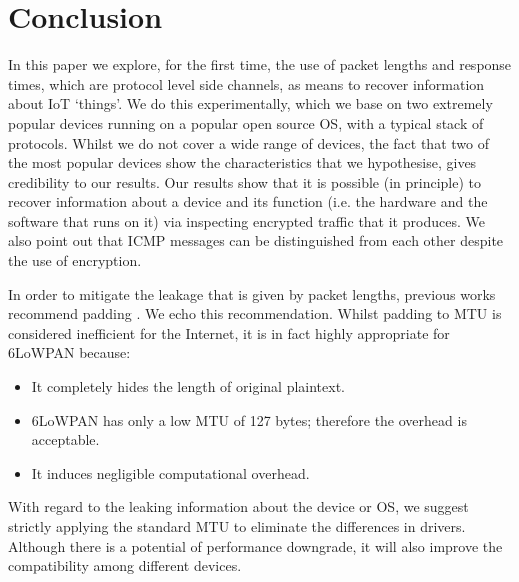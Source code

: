 \section{Conclusion\label{sec: Conclusion}}

In this paper we explore, for the first time, the use of packet lengths and response times, which are protocol level side channels, as means to recover information about IoT `things'. We do this experimentally, which we base on two extremely popular devices running on a popular open source OS, with a typical stack of protocols. Whilst we do not cover a wide range of devices, the fact that two of the most popular devices show the characteristics that we hypothesise, gives credibility to our results. Our results show that it is possible (in principle) to recover information about a device and its function (i.e. the hardware and the software that runs on it) via inspecting encrypted traffic that it produces. We also point out that ICMP messages can be distinguished from each other despite the use of encryption. 

In order to mitigate the leakage that is given by packet lengths, previous works recommend padding \cite{Peekaboo}. We echo this recommendation. Whilst padding to MTU is considered inefficient for the Internet, it is in fact highly appropriate for 6LoWPAN because:
\begin{itemize}
	\item It completely hides the length of original plaintext.
	\item 6LoWPAN has only a low MTU of 127 bytes; therefore the overhead is acceptable.
	\item It induces negligible computational overhead.
\end{itemize}


With regard to the leaking information about the device or OS, we suggest strictly applying the standard MTU to eliminate the differences in drivers. Although there is a potential of performance downgrade, it will also improve the compatibility among different devices.


